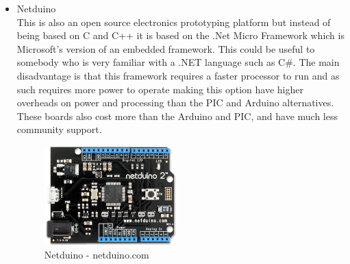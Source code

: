 \begin{itemize}
\item Netduino
\\This is also an open source electronics prototyping platform but instead of being based on C and C++ it is based on the .Net Micro Framework which is Microsoft's version of an embedded framework.  This could be useful to somebody who is very familiar with a .NET language such as C\#.  The main disadvantage is that this framework requires a faster processor to run and as such requires more power to operate making this option have higher overheads on power and processing than the PIC and Arduino alternatives.
\\These boards also cost more than the Arduino and PIC, and have much less community support.
\begin{figure}[H]
\centering
        \includegraphics[width=2.0in] {Images/netduino.png}
        \caption{Netduino - netduino.com}
        \label{Netduino}
\end{figure}


\end{itemize}
